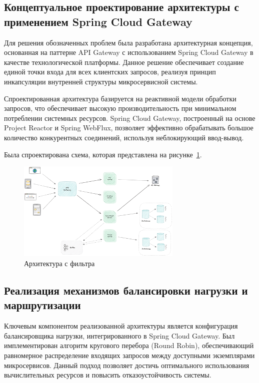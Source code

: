 \subsection{Концептуальное проектирование архитектуры с применением Spring Cloud Gateway}

Для решения обозначенных проблем была разработана архитектурная концепция, основанная на паттерне API Gateway с использованием Spring Cloud Gateway в качестве технологической платформы. Данное решение обеспечивает создание единой точки входа для всех клиентских запросов, реализуя принцип инкапсуляции внутренней структуры микросервисной системы.

Спроектированная архитектура базируется на реактивной модели обработки запросов, что обеспечивает высокую производительность при минимальном потреблении системных ресурсов. Spring Cloud Gateway, построенный на основе Project Reactor и Spring WebFlux, позволяет эффективно обрабатывать большое количество конкурентных соединений, используя неблокирующий ввод-вывод.

Была спроектирована схема, которая представлена на рисунке~\ref{fig:w-gateway-project}.
\begin{figure}[htbp]
    \centering
    \includegraphics[width=0.7\textwidth]{Dissertation/images/w_gw_proj}
    \caption{Архитектура с фильтра}
    \label{fig:w-gateway-project}
\end{figure}

\subsection{Реализация механизмов балансировки нагрузки и маршрутизации}

Ключевым компонентом реализованной архитектуры является конфигурация балансировщика нагрузки, интегрированного в Spring Cloud Gateway. Был имплементирован алгоритм кругового перебора (Round Robin), обеспечивающий равномерное распределение входящих запросов между доступными экземплярами микросервисов. Данный подход позволяет достичь оптимального использования вычислительных ресурсов и повысить отказоустойчивость системы.

